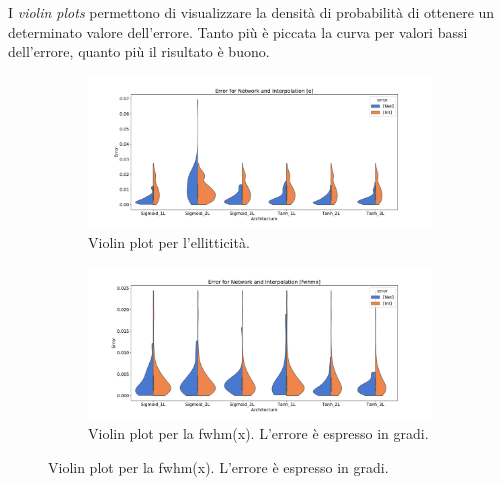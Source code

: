\documentclass[12pt,a4paper,final]{book}
\begin{document}
\newpage
I \textit{violin plots} permettono di visualizzare la densità di probabilità di ottenere un determinato valore dell'errore. Tanto più è piccata la curva per valori bassi dell'errore, quanto più il risultato è buono.

\vspace{3cm}
\begin{figure}[!ht]
	\begin{subfigure}{\textwidth}
	    \centering
	    \includegraphics[width=\linewidth]{../figures/violin_plot_e.pdf}
	    \caption{Violin plot per l'ellitticità.}
	    \label{violin_e}
	\end{subfigure}
	\newline
	\newline
	\newline
	\newline
	\begin{subfigure}{\textwidth}
	    \centering
	    \includegraphics[width=\linewidth]{../figures/violin_plot_fwhmx.pdf}
	    \caption{Violin plot per la fwhm(x). L'errore è espresso in gradi.}
	    \label{violin_fwhmx}
	\end{subfigure}
\end{figure}
\newpage
\end{document}

